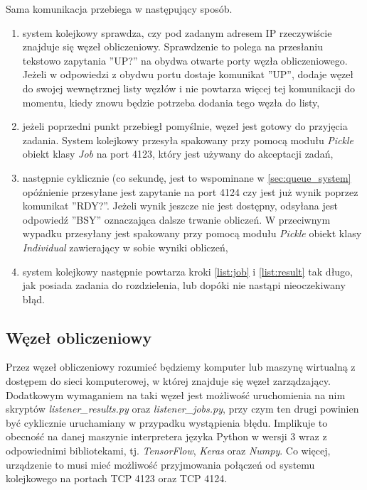 Sama komunikacja przebiega w następujący sposób.
\begin{enumerate}
  \item system kolejkowy sprawdza, czy pod zadanym adresem IP rzeczywiście znajduje się węzeł obliczeniowy.
  Sprawdzenie to polega na przesłaniu tekstowo zapytania ''UP?'' na obydwa otwarte porty węzła obliczeniowego.
  Jeżeli w odpowiedzi z obydwu portu dostaje komunikat ''UP'', dodaje węzeł do swojej wewnętrznej listy węzłów i nie powtarza więcej tej komunikacji do momentu, kiedy znowu będzie potrzeba dodania tego węzła do listy,
  \item jeżeli poprzedni punkt przebiegł pomyślnie, węzeł jest gotowy do przyjęcia zadania.
  System kolejkowy przesyła spakowany przy pomocą modułu \textit{Pickle} obiekt klasy \textit{Job} na port 4123, który jest używany do akceptacji zadań,\label{list:job}
  \item następnie cyklicznie (co sekundę, jest to wspominane w \ref{sec:queue_system} opóźnienie przesyłane jest zapytanie na port 4124 czy jest już wynik poprzez komunikat ''RDY?''.
  Jeżeli wynik jeszcze nie jest dostępny, odsyłana jest odpowiedź ''BSY'' oznaczająca dalsze trwanie obliczeń.\label{list:result}
  W przeciwnym wypadku przesyłany jest spakowany przy pomocą modułu \textit{Pickle} obiekt klasy \textit{Individual} zawierający w sobie wyniki obliczeń,
  \item system kolejkowy następnie powtarza kroki \ref{list:job} i \ref{list:result} tak długo, jak posiada zadania do rozdzielenia, lub dopóki nie nastąpi nieoczekiwany błąd.
\end{enumerate}

\subsection{Węzeł obliczeniowy}\label{sec:worker_node}

Przez węzeł obliczeniowy rozumieć będziemy komputer lub maszynę wirtualną z dostępem do sieci komputerowej, w której znajduje się węzeł zarządzający.
Dodatkowym wymaganiem na taki węzeł jest możliwość uruchomienia na nim skryptów \textit{listener\_results.py} oraz \textit{listener\_jobs.py}, przy czym ten drugi powinien być cyklicznie uruchamiany w przypadku wystąpienia błędu.
Implikuje to obecność na danej maszynie interpretera języka Python w wersji 3 wraz z odpowiednimi bibliotekami, tj. \textit{TensorFlow}\cite{tensorflow2015-whitepaper}, \textit{Keras}\cite{chollet2015keras} oraz \textit{Numpy}\cite{ascher.dubois.hinsen.hugunin.oliphant-1999-np}.
Co więcej, urządzenie to musi mieć możliwość przyjmowania połączeń od systemu kolejkowego na portach TCP 4123 oraz TCP 4124.

